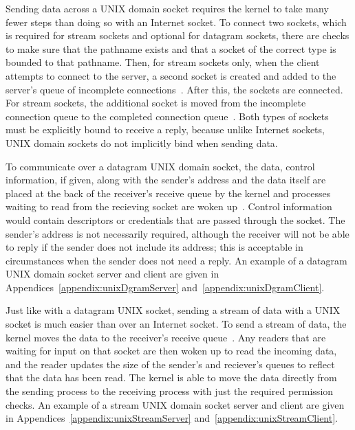 Sending data across a UNIX domain socket requires the kernel to take many fewer steps than doing so with an Internet socket.  To connect two sockets, which is required for stream sockets and optional for datagram sockets, there are checks to make sure that the pathname exists and that a socket of the correct type is bounded to that pathname.  Then, for stream sockets only, when the client attempts to connect to the server, a second socket is created and added to the server's queue of incomplete connections~\cite[p 240--245]{Stevens:1996:TIT:233130}.  After this, the sockets are connected.  For stream sockets, the additional socket is moved from the incomplete connection queue to the completed connection queue~\cite[p 245--249]{Stevens:1996:TIT:233130}.  Both types of sockets must be explicitly bound to receive a reply, because unlike Internet sockets, UNIX domain sockets do not implicitly bind when sending data.

To communicate over a datagram UNIX domain socket, the data, control information, if given, along with the sender's address and the data itself are placed at the back of the receiver's receive queue by the kernel and processes waiting to read from the recieving socket are woken up~\cite[p 263--265]{Stevens:1996:TIT:233130}.  Control information would contain descriptors or credentials that are passed through the socket.  The sender's address is not necessarily required, although the receiver will not be able to reply if the sender does not include its address; this is acceptable in circumstances when the sender does not need a reply.  An example of a datagram UNIX domain socket server and client are given in Appendices~\ref{appendix:unixDgramServer} and~\ref{appendix:unixDgramClient}.

Just like with a datagram UNIX socket, sending a stream of data with a UNIX socket is much easier than over an Internet socket.  To send a stream of data, the kernel moves the data to the receiver's receive queue~\cite[p 265--268]{Stevens:1996:TIT:233130}.  Any readers that are waiting for input on that socket are then woken up to read the incoming data, and the reader updates the size of the sender's and reciever's queues to reflect that the data has been read.  The kernel is able to move the data directly from the sending process to the receiving process with just the required permission checks.  An example of a stream UNIX domain socket server and client are given in Appendices~\ref{appendix:unixStreamServer} and~\ref{appendix:unixStreamClient}.

